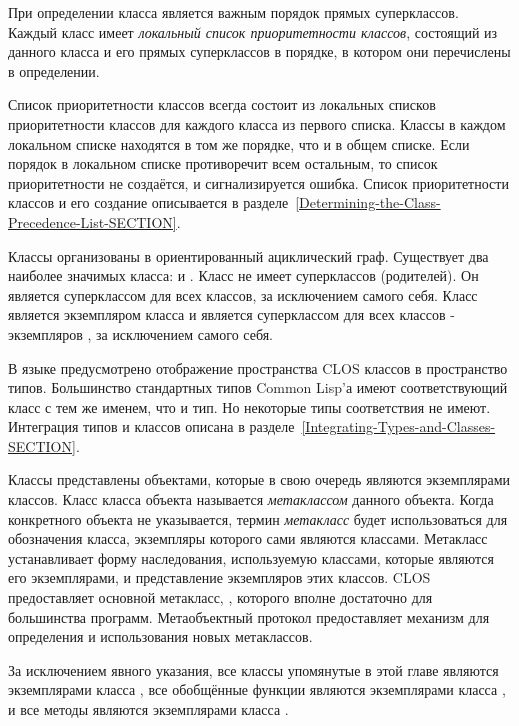 При определении класса является важным порядок прямых суперклассов. Каждый класс
имеет \emph{локальный список приоритетности классов}, состоящий из данного класса
и его прямых суперклассов в порядке, в котором они перечислены в определении.

Список приоритетности классов всегда состоит из локальных списков приоритетности
классов для каждого класса из первого списка. Классы в каждом локальном
списке находятся в том же порядке, что и в общем списке. Если
порядок в локальном списке противоречит всем остальным, то 
список приоритетности не создаётся, и сигнализируется ошибка.
Список приоритетности классов и его создание описывается в
разделе~\ref{Determining-the-Class-Precedence-List-SECTION}.

Классы организованы в ориентированный ациклический граф. Существует два наиболее
значимых класса:  и . Класс  не имеет
суперклассов (родителей). Он является суперклассом для всех классов, за
исключением самого себя. Класс  является экземпляром класса
 и является суперклассом для всех классов - экземпляров
, за исключением самого себя.

В языке предусмотрено отображение пространства CLOS классов в пространство
типов. Большинство стандартных типов Common Lisp'а имеют соответствующий класс с
тем же именем, что и тип. Но некоторые типы соответствия не имеют. Интеграция
типов и классов описана в разделе~\ref{Integrating-Types-and-Classes-SECTION}.

Классы представлены объектами, которые в свою очередь являются экземплярами
классов. Класс класса объекта называется \emph{метаклассом} данного
объекта. Когда конкретного объекта не указывается, термин \emph{метакласс} будет
использоваться для обозначения класса, экземпляры которого сами являются
классами.
Метакласс устанавливает форму наследования, используемую классами, которые
являются его экземплярами, и представление экземпляров этих классов.
CLOS предоставляет основной метакласс, , которого вполне
достаточно для большинства программ. Метаобъектный протокол предоставляет
механизм для определения и использования новых метаклассов.

За исключением явного указания, все классы упомянутые в этой главе являются
экземплярами класса , все обобщённые функции являются
экземплярами класса , и все методы являются
экземплярами класса .

